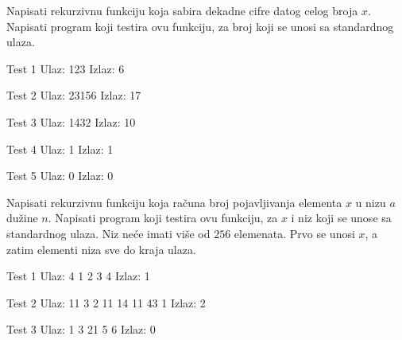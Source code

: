 \begin{Exercise}[label=111]
Napisati rekurzivnu funkciju koja sabira dekadne cifre datog
  celog broja $x$. Napisati program koji testira ovu funkciju, za broj
  koji se unosi sa standardnog ulaza.
  
\begin{minitest}
\begin{test}{Test 1}
Ulaz:    123  
Izlaz:   6 
\end{test}
\end{minitest}
\begin{minitest}
\begin{test}{Test 2}
Ulaz:    23156    
Izlaz:   17 
\end{test}
\end{minitest}
\begin{minitest}
\begin{test}{Test 3}
Ulaz:   1432
Izlaz:   10        
\end{test}
\end{minitest}

\begin{minitest}
\begin{test}{Test 4}
Ulaz:   1       
Izlaz:  1       
\end{test}
\end{minitest}
\begin{minitest}
\begin{test}{Test 5}
Ulaz:   0
Izlaz:  0
\end{test}
\end{minitest}
\end{Exercise}
\begin{Answer}[ref=111]
\end{Answer}


\begin{Exercise}[label=112]
Napisati rekurzivnu funkciju koja računa broj pojavljivanja
  elementa $x$ u nizu $a$ dužine $n$. Napisati program koji testira
  ovu funkciju, za $x$ i niz koji se unose sa standardnog
  ulaza. Niz neće imati više od $256$ elemenata. Prvo se unosi $x$, a zatim
  elementi niza sve do kraja ulaza.
  
\begin{minitest}
\begin{test}{Test 1}
Ulaz:    4 1 2 3 4     
Izlaz:   1              
\end{test}
\end{minitest}
\begin{miditest}
\begin{test}{Test 2}
Ulaz:   11 3 2 11 14 11 43 1      
Izlaz:   2                      
\end{test}
\end{miditest}

\begin{minitest}
\begin{test}{Test 3}
Ulaz:  1 3 21 5 6
Izlaz:  0    
\end{test}
\end{minitest}
\end{Exercise}
\begin{Answer}[ref=112]
\end{Answer}


